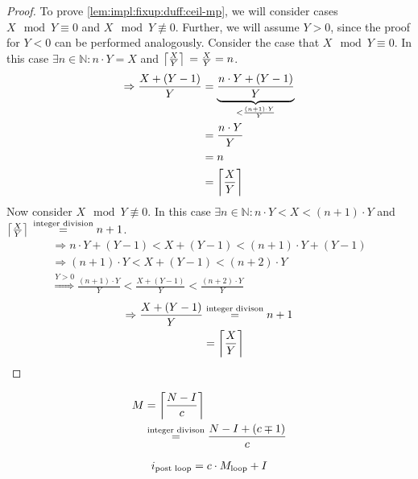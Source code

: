 \begin{proof}
    To prove \cref{lem:impl:fixup:duff:ceil-mp}, we will consider cases $X \mod Y \equiv 0$ and $X \mod Y \not\equiv 0$.
    Further, we will assume $Y > 0$, since the proof for $Y < 0$ can be performed analogously.
    Consider the case that $X \mod Y \equiv 0$.
    In this case $\exists n \in \mathbb{N}: n \cdot Y = X$ and $\left\lceil{}\frac{X}{Y}\right\rceil{} = \frac{X}{Y} = n$.
    \begin{align*}
        \Rightarrow \frac{X + (Y - 1)}{Y} &= \underbrace{\frac{n \cdot Y + (Y - 1)}{Y}}_{< \frac{(n + 1) \cdot Y}{Y}}\\
        &= \frac{n \cdot Y}{Y}\\
        &= n\\
        &= \left\lceil{}\frac{X}{Y}\right\rceil{}
    \end{align*}
    Now consider $X \mod Y \not\equiv 0$.
    In this case $\exists n \in \mathbb{N}: n \cdot Y < X < (n + 1) \cdot Y$ and $\left\lceil{}\frac{X}{Y}\right\rceil{} \overset{\text{integer division}}{=} n + 1$.
    \begin{align*}
        \Rightarrow n \cdot Y + (Y - 1) < X + (Y - 1) < (n + 1) \cdot Y + (Y - 1)\\
        \Rightarrow (n + 1) \cdot Y < X + (Y - 1) < (n + 2) \cdot Y\\
        \overset{Y > 0}{\Rightarrow} \frac{(n + 1) \cdot Y}{Y} < \frac{X + (Y - 1)}{Y} < \frac{(n + 2) \cdot Y}{Y}
    \end{align*}
    \begin{align*}
        \Rightarrow \frac{X + (Y - 1)}{Y} &\overset{\text{integer divison}}= n + 1\\
        &= \left\lceil{}\frac{X}{Y}\right\rceil{}
    \end{align*}
\end{proof}

\begin{equation}\label{eqn:impl:fixup:duff:total-iteration-based-on-bounds}
\begin{aligned}
    M &= \left\lceil{}\frac{N - I}{c}\right\rceil{} \\
    & \overset{\text{integer divison}}{=} \frac{N - I + (c \mp 1)}{c}
\end{aligned}
\end{equation}

\begin{equation}\label{eqn:impl:fixup:duff:i-after-loop}
\begin{aligned}
    i_\text{post loop} = c \cdot M_{\text{loop}} + I
\end{aligned}
\end{equation}

